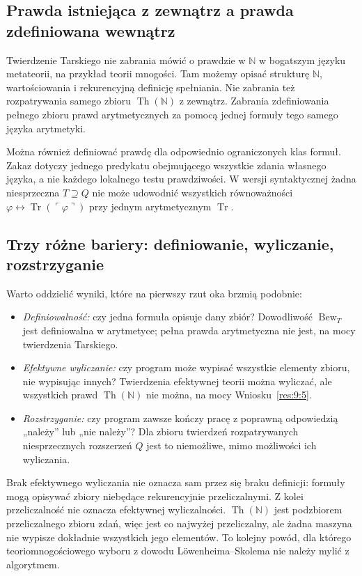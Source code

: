 \subsection*{Prawda istniejąca z zewnątrz a prawda zdefiniowana wewnątrz}\label{sec:18:3}
Twierdzenie Tarskiego nie zabrania mówić o prawdzie w $\mathbb N$ w bogatszym języku metateorii, na przykład teorii mnogości. Tam możemy opisać strukturę $\mathbb N$, wartościowania i rekurencyjną definicję spełniania. Nie zabrania też rozpatrywania samego zbioru $\operatorname{Th}(\mathbb N)$ z zewnątrz. Zabrania zdefiniowania pełnego zbioru prawd arytmetycznych za pomocą jednej formuły tego samego języka arytmetyki.

Można również definiować prawdę dla odpowiednio ograniczonych klas formuł. Zakaz dotyczy jednego predykatu obejmującego wszystkie zdania własnego języka, a nie każdego lokalnego testu prawdziwości. W wersji syntaktycznej żadna niesprzeczna $T\supseteq Q$ nie może udowodnić wszystkich równoważności $\varphi\leftrightarrow\operatorname{Tr}(\ulcorner\varphi\urcorner)$ przy jednym arytmetycznym $\operatorname{Tr}$.

\subsection*{Trzy różne bariery: definiowanie, wyliczanie, rozstrzyganie}\label{sec:18:4}
Warto oddzielić wyniki, które na pierwszy rzut oka brzmią podobnie:
\begin{itemize}
\item \emph{Definiowalność:} czy jedna formuła opisuje dany zbiór? Dowodliwość $\operatorname{Bew}_T$ jest definiowalna w arytmetyce; pełna prawda arytmetyczna nie jest, na mocy twierdzenia Tarskiego.
\item \emph{Efektywne wyliczanie:} czy program może wypisać wszystkie elementy zbioru, nie wypisując innych? Twierdzenia efektywnej teorii można wyliczać, ale wszystkich prawd $\operatorname{Th}(\mathbb N)$ nie można, na mocy Wniosku~\ref{res:9:5}.
\item \emph{Rozstrzyganie:} czy program zawsze kończy pracę z poprawną odpowiedzią „należy” lub „nie należy”? Dla zbioru twierdzeń rozpatrywanych niesprzecznych rozszerzeń $Q$ jest to niemożliwe, mimo możliwości ich wyliczania.
\end{itemize}
Brak efektywnego wyliczania nie oznacza sam przez się braku definicji: formuły mogą opisywać zbiory niebędące rekurencyjnie przeliczalnymi. Z kolei przeliczalność nie oznacza efektywnej wyliczalności. $\operatorname{Th}(\mathbb N)$ jest podzbiorem przeliczalnego zbioru zdań, więc jest co najwyżej przeliczalny, ale żadna maszyna nie wypisze dokładnie wszystkich jego elementów. To kolejny powód, dla którego teoriomnogościowego wyboru z dowodu Löwenheima--Skolema nie należy mylić z algorytmem.

